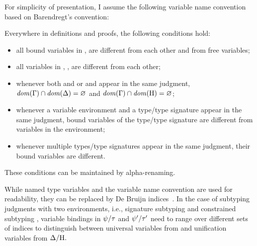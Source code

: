 For simplicity of presentation, I assume the following variable name
convention based on Barendregt's convention:

\begin{definition}\label{def:var-names}
    Everywhere in definitions and proofs, the following conditions hold:
    \begin{itemize}
        \item all bound variables in \ty, \tysig are different from each other 
            and from free variables;
        \item all variables in \AEnv, \UEnv, \UEnvD are different 
            from each other;
        \item whenever both \AEnv and \UEnv or \AEnv and \UEnvD
            appear in the same judgment, 
            $\operatorname{\mathit{dom}}(\Gamma) \cap \operatorname{\mathit{dom}}(\Delta) = \varnothing$ and
                $\operatorname{\mathit{dom}}(\Gamma) \cap \operatorname{\mathit{dom}}(\mathrm{H}) = \varnothing$;
        \item whenever a variable environment and a type/type signature
            appear in the same judgment, bound variables of the type/type
            signature are different from variables in the environment;
        \item whenever multiple types/type signatures appear in the same
            judgment, their bound variables are different.
    \end{itemize}
    These conditions can be maintained by alpha-renaming.
\end{definition}

While named type variables and the variable name convention are used for
readability, they can be replaced by De Bruijn
indices~\cite{bib:DEBRUIJN1972381}.
In the case of subtyping judgments with two environments, i.e.,
signature subtyping  and constrained subtyping
, variable bindings in $\psi/\tau$ and $\psi'/\tau'$
need to range over different sets of indices to distinguish between universal
variables from \AEnv and unification variables from $\Delta/\mathrm{H}.$

